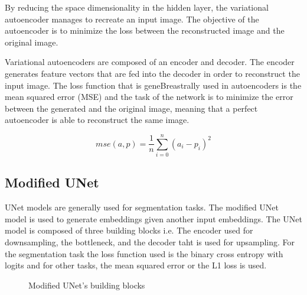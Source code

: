 \documentclass[11pt]{article}
\begin{document}
    
By reducing the space dimensionality in the hidden layer, the variational autoencoder manages to recreate an input image. The objective of the autoencoder is to minimize the loss between the reconstructed image and the original image.
    
Variational autoencoders \cite{pinheiro2021variational} are composed of an encoder and decoder. The encoder generates feature vectors that are fed into the decoder in order to reconstruct the input image. The loss function that is geneBreastrally used in autoencoders is the mean squared error (MSE) and the task of the network is to minimize the error between the generated and the original image, meaning that a perfect autoencoder is able to reconstruct the same image. 
    
    
    \begin{equation}
        mse(a,p)= \frac{1}{n} \sum_{i=0}^{n} (a_i - p_i)^2
    \end{equation}
 \subsection{Modified UNet}
 UNet models are generally used for segmentation tasks. The modified UNet model is used to generate embeddings given another input embeddings. The UNet model is composed of three building blocks i.e. The encoder used for downsampling, the bottleneck, and the decoder taht is used for upsampling. For the segmentation task the loss function used is the binary cross entropy with logits and for other tasks, the mean squared error or the L1 loss is used. 

 \begin{figure}[h!]
  \centering
{}
\caption{Modified UNet's building blocks}
\end{figure}
\end{document}
